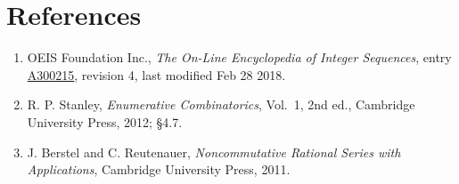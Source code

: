 \documentclass[11pt]{article}
\theoremstyle{definition}
\begin{document}
\section{References}

\begin{enumerate}

\item OEIS Foundation Inc., \emph{The On-Line Encyclopedia of Integer Sequences}, entry \href{https://oeis.org/A300215}{A300215}, revision 4, last modified Feb 28 2018.

\item R. P. Stanley, \emph{Enumerative Combinatorics}, Vol.~1, 2nd ed., Cambridge University Press, 2012; \S4.7.

\item J. Berstel and C. Reutenauer, \emph{Noncommutative Rational Series with Applications}, Cambridge University Press, 2011.

\end{enumerate}
\end{document}

